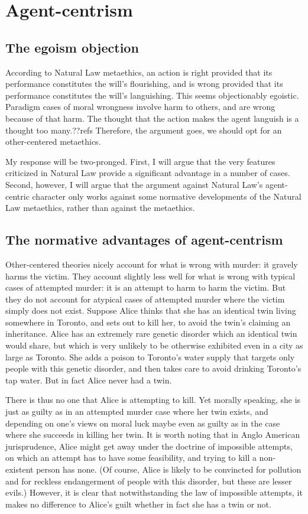 \section{Agent-centrism}
\subsection{The egoism objection}
According to Natural Law metaethics, an action is right provided that its performance constitutes the will's flourishing,
and is wrong provided that its performance constitutes the will's languishing. This seems objectionably egoistic. Paradigm
cases of moral wrongness involve harm to others, and are wrong because of that harm. The thought that the action makes the 
agent languish is a thought too many.??refs Therefore, the argument goes, we should opt for an other-centered metaethics.

My response will be two-pronged. First, I will argue that the very features criticized in Natural Law provide a significant advantage
in a number of cases. Second, however, I will argue that the argument against Natural Law's agent-centric character only works
against some normative developments of the Natural Law metaethics, rather than against the metaethics. 

\subsection{The normative advantages of agent-centrism}
Other-centered theories nicely account for what is wrong with murder: it gravely harms the victim. They account slightly less well 
for what is wrong with typical cases of attempted murder: it is an attempt to harm to harm the victim. But they do not account for
atypical cases of attempted murder where the victim simply does not exist. Suppose Alice thinks that she has an identical twin 
living somewhere in Toronto, and sets out to kill her, to avoid the twin's claiming an inheritance. Alice has an extremely rare
genetic disorder which an identical twin would share, but which is very unlikely to be otherwise exhibited even in a city as large as
Toronto. She adds a poison to Toronto's water supply that targets only people with this genetic disorder, and then takes care to avoid
drinking Toronto's tap water. But in fact Alice never had a twin. 

There is thus no one that Alice is attempting to kill. Yet morally speaking, she is just as guilty as in an attempted murder case 
where her twin exists, and depending on one's views on moral luck maybe even as guilty as in the case where she succeeds in killing 
her twin. It is worth noting that in Anglo American jurisprudence, Alice might get away under the doctrine of impossible attempts,
on which an attempt has to have some feasibility, and trying to kill a non-existent person has none. (Of course, Alice is likely to be
convincted for pollution and for reckless endangerment of people with this disorder, but these are lesser evils.) However, it is clear 
that notwithstanding the law of impossible attempts, it makes no difference to Alice's guilt whether in fact she has a twin or not.

